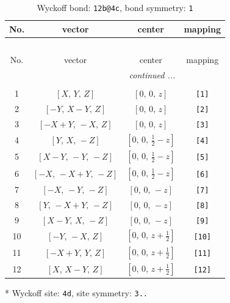\documentclass[fleqn,8pt]{jsarticle}
\begin{document}
\begin{longtable}{cccc}
\caption{Wyckoff bond: {\tt 12b@4c}, bond symmetry: {\tt 1}}
 \\
 \hline \hline
No. & vector & center & mapping \\ \hline \endfirsthead

\multicolumn{3}{l}{\tablename\ \thetable{}} \\
 \hline \hline
No. & vector & center & mapping \\ \hline \endhead

 \hline \hline
\multicolumn{3}{r}{\footnotesize\it continued ...} \\ \endfoot

 \hline \hline
\multicolumn{3}{r}{} \\ \endlastfoot

1 & $\left[ X,\, Y,\, Z \right]$ & $\left[ 0,\, 0,\, z \right]$ & {\tt [1]} \\ \hline
2 & $\left[ - Y,\, X - Y,\, Z \right]$ & $\left[ 0,\, 0,\, z \right]$ & {\tt [2]} \\ \hline
3 & $\left[ - X + Y,\, - X,\, Z \right]$ & $\left[ 0,\, 0,\, z \right]$ & {\tt [3]} \\ \hline
4 & $\left[ Y,\, X,\, - Z \right]$ & $\left[ 0,\, 0,\, \frac{1}{2} - z \right]$ & {\tt [4]} \\ \hline
5 & $\left[ X - Y,\, - Y,\, - Z \right]$ & $\left[ 0,\, 0,\, \frac{1}{2} - z \right]$ & {\tt [5]} \\ \hline
6 & $\left[ - X,\, - X + Y,\, - Z \right]$ & $\left[ 0,\, 0,\, \frac{1}{2} - z \right]$ & {\tt [6]} \\ \hline
7 & $\left[ - X,\, - Y,\, - Z \right]$ & $\left[ 0,\, 0,\, - z \right]$ & {\tt [7]} \\ \hline
8 & $\left[ Y,\, - X + Y,\, - Z \right]$ & $\left[ 0,\, 0,\, - z \right]$ & {\tt [8]} \\ \hline
9 & $\left[ X - Y,\, X,\, - Z \right]$ & $\left[ 0,\, 0,\, - z \right]$ & {\tt [9]} \\ \hline
10 & $\left[ - Y,\, - X,\, Z \right]$ & $\left[ 0,\, 0,\, z + \frac{1}{2} \right]$ & {\tt [10]} \\ \hline
11 & $\left[ - X + Y,\, Y,\, Z \right]$ & $\left[ 0,\, 0,\, z + \frac{1}{2} \right]$ & {\tt [11]} \\ \hline
12 & $\left[ X,\, X - Y,\, Z \right]$ & $\left[ 0,\, 0,\, z + \frac{1}{2} \right]$ & {\tt [12]} \\
\end{longtable}
* Wyckoff site: {\tt 4d}, site symmetry: {\tt 3..}
\end{document}
